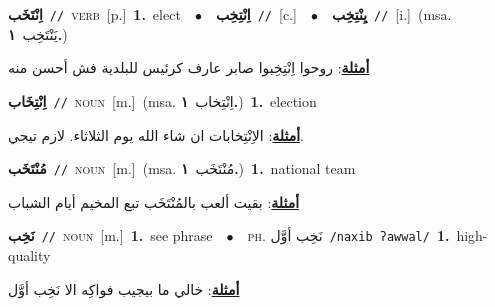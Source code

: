 \documentclass[10pt,a4paper,twoside]{article} %
\begin{document}
\begin{multicols}{2}
{\setlength\topsep{0pt}\textbf{\foreignlanguage{arabic}{اِنْتَخَب}}\ {\color{gray}\texttt{//}\color{black}}\ \textsc{verb}\ [p.]\ \textbf{1.}~elect\ \ $\bullet$\ \ \setlength\topsep{0pt}\textbf{\foreignlanguage{arabic}{اِنْتِخِب}}\ {\color{gray}\texttt{//}\color{black}}\ [c.]\ \ $\bullet$\ \ \setlength\topsep{0pt}\textbf{\foreignlanguage{arabic}{يِنْتِخِب}}\ {\color{gray}\texttt{//}\color{black}}\ [i.]\ \color{gray}(msa. \foreignlanguage{arabic}{يَنْتَخِب}~\foreignlanguage{arabic}{\textbf{١.}})\color{black}\  \begin{flushright}\color{gray}\foreignlanguage{arabic}{\textbf{\underline{\foreignlanguage{arabic}{أمثلة}}}: روحوا اِنْتِخِبوا صابر عارف كرئيس للبلدية فش أحسن منه}\end{flushright}\color{black}} \vspace{2mm}

{\setlength\topsep{0pt}\textbf{\foreignlanguage{arabic}{اِنْتِخَاب}}\ {\color{gray}\texttt{//}\color{black}}\ \textsc{noun}\ [m.]\ \color{gray}(msa. \foreignlanguage{arabic}{اِنْتِخاب}~\foreignlanguage{arabic}{\textbf{١.}})\color{black}\ \textbf{1.}~election\  \begin{flushright}\color{gray}\foreignlanguage{arabic}{\textbf{\underline{\foreignlanguage{arabic}{أمثلة}}}: الاِنْتِخابات ان شاء الله يوم الثلاثاء. لازم تيجي.}\end{flushright}\color{black}} \vspace{2mm}

{\setlength\topsep{0pt}\textbf{\foreignlanguage{arabic}{مُنْتَخَب}}\ {\color{gray}\texttt{//}\color{black}}\ \textsc{noun}\ [m.]\ \color{gray}(msa. \foreignlanguage{arabic}{مُنْتَخَب}~\foreignlanguage{arabic}{\textbf{١.}})\color{black}\ \textbf{1.}~national team\  \begin{flushright}\color{gray}\foreignlanguage{arabic}{\textbf{\underline{\foreignlanguage{arabic}{أمثلة}}}: بقيت ألعب بالمُنْتَخَب تبع المخيم أيام الشباب}\end{flushright}\color{black}} \vspace{2mm}

{\setlength\topsep{0pt}\textbf{\foreignlanguage{arabic}{نَخِب}}\ {\color{gray}\texttt{//}\color{black}}\ \textsc{noun}\ [m.]\ \textbf{1.}~see phrase\ \ $\bullet$\ \ \textsc{ph.} \color{gray} \foreignlanguage{arabic}{نَخِب أوَّل}\color{black}\ {\color{gray}\texttt{/{\sffamily naxib ʔawwal}/}\color{black}}\ \textbf{1.}~high-quality\  \begin{flushright}\color{gray}\foreignlanguage{arabic}{\textbf{\underline{\foreignlanguage{arabic}{أمثلة}}}: خالي ما بيجيب فواكِه الا نَخِب أوَّل}\end{flushright}\color{black}} \vspace{2mm}


\end{multicols}
\end{document}
